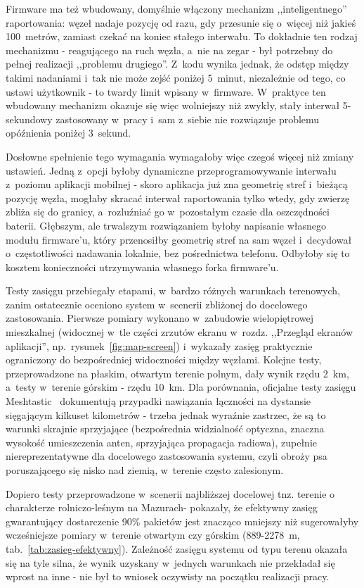 Firmware ma też wbudowany, domyślnie włączony mechanizm ,,inteligentnego'' raportowania: węzeł
nadaje pozycję od razu, gdy przesunie się o~więcej niż jakieś 100~metrów, zamiast czekać na koniec
stałego interwału. To dokładnie ten rodzaj mechanizmu - reagującego na ruch węzła, a~nie na zegar -
był potrzebny do pełnej realizacji ,,problemu drugiego''. Z~kodu wynika jednak, że odstęp między
takimi nadaniami i~tak nie może zejść poniżej 5~minut, niezależnie od tego, co ustawi użytkownik -
to twardy limit wpisany w~firmware. W~praktyce ten wbudowany mechanizm okazuje się więc wolniejszy
niż zwykły, stały interwał 5-sekundowy zastosowany w~pracy i~sam z~siebie nie rozwiązuje problemu
opóźnienia poniżej 3~sekund.

Dosłowne spełnienie tego wymagania wymagałoby więc czegoś więcej niż zmiany ustawień. Jedną
z~opcji byłoby dynamiczne przeprogramowywanie interwału z~poziomu aplikacji mobilnej - skoro
aplikacja już zna geometrię stref i~bieżącą pozycję węzła, mogłaby skracać interwał raportowania
tylko wtedy, gdy zwierzę zbliża się do granicy, a~rozluźniać go w~pozostałym czasie dla
oszczędności baterii. Głębszym, ale trwalszym rozwiązaniem byłoby napisanie własnego modułu 
firmware'u, który przenosiłby geometrię stref na sam węzeł i~decydował o~częstotliwości nadawania
lokalnie, bez pośrednictwa telefonu. Odbyłoby się to kosztem konieczności utrzymywania własnego forka firmware'u.

    Testy zasięgu przebiegały etapami, w~bardzo różnych warunkach terenowych, zanim ostatecznie
oceniono system w~scenerii zbliżonej do docelowego zastosowania. Pierwsze pomiary wykonano
w~zabudowie wielopiętrowej mieszkalnej (widocznej w~tle części zrzutów ekranu w~rozdz.
,,Przegląd ekranów aplikacji'', np.\ rysunek~\ref{fig:map-screen})
i~wykazały zasięg praktycznie ograniczony do bezpośredniej widoczności między węzłami. Kolejne
testy, przeprowadzone na płaskim, otwartym terenie polnym, dały wynik rzędu 2~km, a~testy
w~terenie górskim - rzędu 10~km. Dla porównania, oficjalne testy zasięgu Meshtastic~\cite{meshtasticRangeTests} dokumentują przypadki nawiązania
łączności na dystansie sięgającym kilkuset kilometrów - trzeba jednak wyraźnie zastrzec, że są to
warunki skrajnie sprzyjające (bezpośrednia widzialność optyczna, znaczna wysokość umieszczenia
anten, sprzyjająca propagacja radiowa), zupełnie niereprezentatywne dla docelowego zastosowania
systemu, czyli obroży psa poruszającego się nisko nad ziemią, w~terenie często zalesionym.

Dopiero testy przeprowadzone w~scenerii najbliższej docelowej tnz. terenie o charakterze rolniczo-leśnym na
Mazurach- pokazały, że efektywny zasięg gwarantujący dostarczenie 90\% pakietów jest znacząco mniejszy niż sugerowałyby wcześniejsze pomiary w~terenie
otwartym czy górskim (889-2278~m, tab.~\ref{tab:zasieg-efektywny}). Zależność zasięgu systemu od
typu terenu okazała się na tyle silna, że wynik uzyskany w~jednych warunkach nie przekładał się
wprost na inne - nie był to wniosek oczywisty na początku realizacji pracy.

